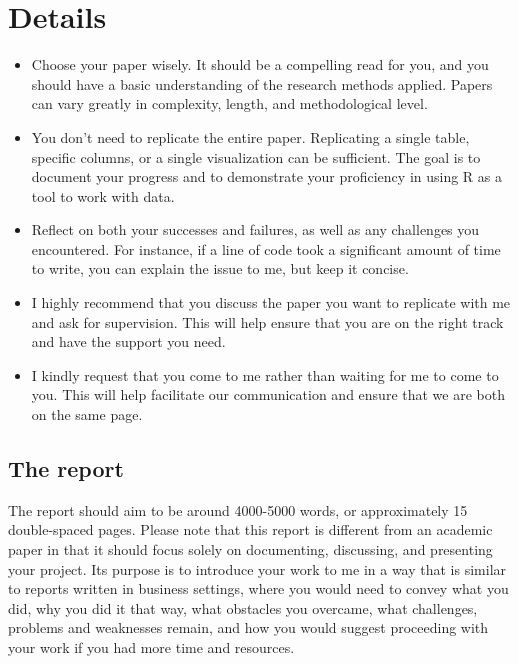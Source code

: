 \documentclass[
  12pt,
]{article}
\providecommand{\tightlist}{%
  \setlength{\itemsep}{0pt}\setlength{\parskip}{0pt}}
\begin{document}
\hypertarget{details}{%
\section{Details}\label{details}}

\begin{itemize}
\tightlist
\item
  Choose your paper wisely. It should be a compelling read for you, and you should have a basic understanding of the research methods applied. Papers can vary greatly in complexity, length, and methodological level.
\item
  You don't need to replicate the entire paper. Replicating a single table, specific columns, or a single visualization can be sufficient. The goal is to document your progress and to demonstrate your proficiency in using R as a tool to work with data.
\item
  Reflect on both your successes and failures, as well as any challenges you encountered. For instance, if a line of code took a significant amount of time to write, you can explain the issue to me, but keep it concise.
\item
  I highly recommend that you discuss the paper you want to replicate with me and ask for supervision. This will help ensure that you are on the right track and have the support you need.
\item
  I kindly request that you come to me rather than waiting for me to come to you. This will help facilitate our communication and ensure that we are both on the same page.
\end{itemize}

\hypertarget{the-report}{%
\subsection{The report}\label{the-report}}

The report should aim to be around 4000-5000 words, or approximately 15 double-spaced pages. Please note that this report is different from an academic paper in that it should focus solely on documenting, discussing, and presenting your project. Its purpose is to introduce your work to me in a way that is similar to reports written in business settings, where you would need to convey what you did, why you did it that way, what obstacles you overcame, what challenges, problems and weaknesses remain, and how you would suggest proceeding with your work if you had more time and resources.
\end{document}

